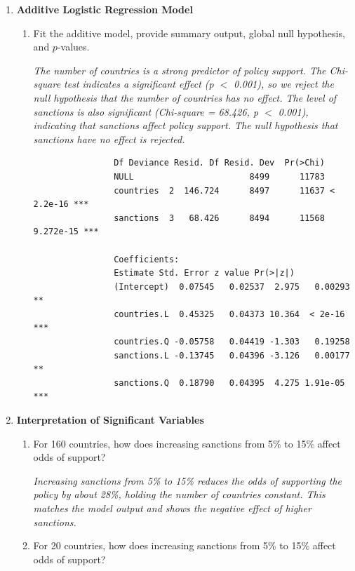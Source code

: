\documentclass[12pt,letterpaper]{article}
\begin{document}
	\begin{enumerate}
		\item \textbf{Additive Logistic Regression Model}
		\begin{enumerate}
			\item Fit the additive model, provide summary output, global null hypothesis, and $p$-values.
			
			
			
			\textit{
				The number of countries is a strong predictor of policy support. The Chi-square test indicates a significant effect (p $<$ 0.001), so we reject the null hypothesis that the number of countries has no effect.  
				The level of sanctions is also significant (Chi-square = 68.426, p $<$ 0.001), indicating that sanctions affect policy support. The null hypothesis that sanctions have no effect is rejected.}
			\begin{verbatim}
				Df Deviance Resid. Df Resid. Dev  Pr(>Chi)
				NULL                       8499      11783
				countries  2  146.724      8497      11637 < 2.2e-16 ***
				sanctions  3   68.426      8494      11568 9.272e-15 ***
				
				Coefficients:
				Estimate Std. Error z value Pr(>|z|)
				(Intercept)  0.07545   0.02537  2.975   0.00293 **
				countries.L  0.45325   0.04373 10.364  < 2e-16 ***
				countries.Q -0.05758   0.04419 -1.303   0.19258
				sanctions.L -0.13745   0.04396 -3.126   0.00177 **
				sanctions.Q  0.18790   0.04395  4.275 1.91e-05 ***
			\end{verbatim}
		\end{enumerate}
		
		\item \textbf{Interpretation of Significant Variables}
		
		\begin{enumerate}
			\item For 160 countries, how does increasing sanctions from 5\% to 15\% affect odds of support?
			
			
			
			\textit{
				Increasing sanctions from 5\% to 15\% reduces the odds of supporting the policy by about 28\%, holding the number of countries constant. This matches the model output and shows the negative effect of higher sanctions.}
			
			\item For 20 countries, how does increasing sanctions from 5\% to 15\% affect odds of support?
			

\end{enumerate}
\end{enumerate}
\end{document}
